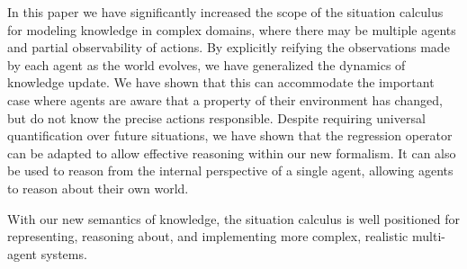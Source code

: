 \documentclass{ifaamas-submission}
\begin{document}
\label{sec:Conclusions}In this paper we have significantly increased
the scope of the situation calculus for modeling knowledge in complex
domains, where there may be multiple agents and partial observability
of actions. By explicitly reifying the observations made by each agent
as the world evolves, we have generalized the dynamics of knowledge
update. We have shown that this can accommodate the important case
where agents are aware that a property of their environment has changed,
but do not know the precise actions responsible. Despite requiring
universal quantification over future situations, we have shown that
the regression operator can be adapted to allow effective reasoning
within our new formalism. It can also be used to reason from the internal
perspective of a single agent, allowing agents to reason about their
own world.

With our new semantics of knowledge, the situation calculus is well
positioned for representing, reasoning about, and implementing more
complex, realistic multi-agent systems.



\end{document}
